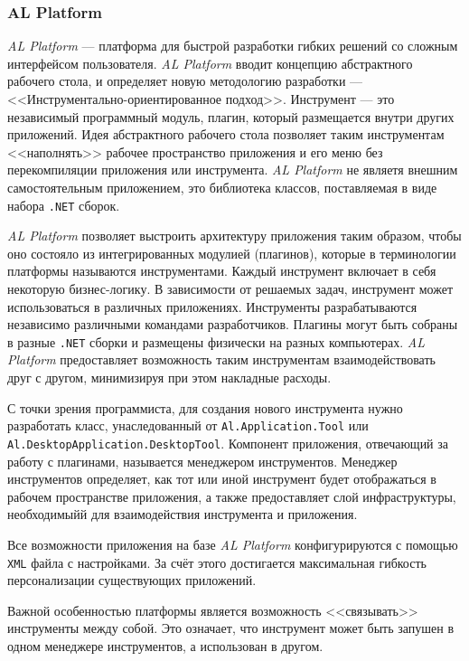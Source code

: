 \subsubsection{AL Platform}

{\it AL Platform} --- платформа для быстрой разработки гибких решений со сложным интерфейсом пользователя. {\it AL Platform} вводит концепцию абстрактного рабочего стола, и определяет новую методологию разработки --- <<Инструментально-ориентированное подход>>. Инструмент --- это независимый программный модуль, плагин, который размещается внутри других приложений. Идея абстрактного рабочего стола позволяет таким инструментам <<наполнять>> рабочее пространство приложения и его меню без перекомпиляции приложения или инструмента. {\it AL Platform} не являетя внешним самостоятельным приложением, это библиотека классов, поставляемая в виде набора {\tt .NET} сборок. 

{\it AL Platform} позволяет выстроить архитектуру приложения таким образом, чтобы оно состояло из интегрированных модулией (плагинов), которые в терминологии платформы называются инструментами. Каждый инструмент включает в себя некоторую бизнес-логику. В зависимости от решаемых задач, инструмент может использоваться в различных приложениях. Инструменты разрабатываются независимо различными командами разработчиков. Плагины могут быть собраны в разные {\tt .NET} сборки и размещены физически на разных компьютерах. {\it AL Platform} предоставляет возможность таким инструментам взаимодействовать друг с другом, минимизируя при этом накладные расходы.

С точки зрения программиста, для создания нового инструмента нужно разработать класс, унаследованный от {\tt Al.Application.Tool} или {\tt Al.DesktopApplication.DesktopTool}. Компонент приложения, отвечающий за работу с плагинами, называется менеджером инструментов. Менеджер инструментов определяет, как тот или иной инструмент будет отображаться в рабочем пространстве приложения, а также предоставляет слой инфраструктуры, необходимыйй для взаимодействия инструмента и приложения. 

Все возможности приложения на базе {\it AL Platform} конфигурируются с помощью {\tt XML} файла с настройками. За счёт этого достигается максимальная гибкость персонализации существующих приложений.

Важной особенностью платформы является возможность <<связывать>> инструменты между собой. Это означает, что инструмент может быть запушен в одном менеджере инструментов, а использован в другом.